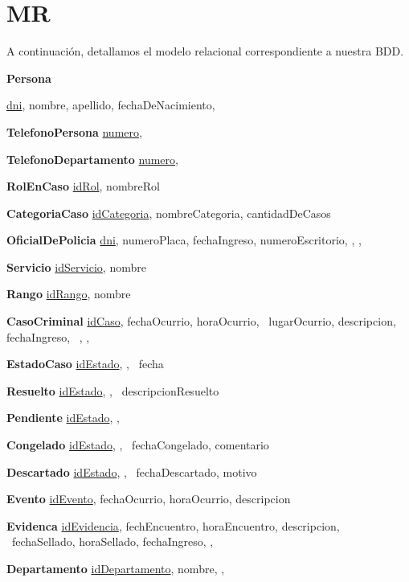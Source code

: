 \documentclass[11pt, a4paper]{article}
\begin{document}
\section{MR}
A continuación, detallamos el modelo relacional correspondiente a nuestra BDD.


\textbf{Persona} {\underline{dni}, nombre, apellido, fechaDeNacimiento, \

\textbf{TelefonoPersona} {\underline{numero}, }

\textbf{TelefonoDepartamento} {\underline{numero}, }

\textbf{RolEnCaso} {\underline{idRol}, nombreRol}

\textbf{CategoriaCaso} {\underline{idCategoria}, nombreCategoria, cantidadDeCasos}

\textbf{OficialDePolicia} {\underline{dni}, numeroPlaca, fechaIngreso, 
	numeroEscritorio, \dashuline{idRango}, \dashuline{idServicio},
	}

\textbf{Servicio} {\underline{idServicio}, nombre}

\textbf{Rango} {\underline{idRango}, nombre}

\textbf{CasoCriminal} {\underline{idCaso}, fechaOcurrio, horaOcurrio, \ 
	lugarOcurrio, descripcion, fechaIngreso, \
	, , \
	}

\textbf{EstadoCaso} {\underline{idEstado}, , \
	fecha}

\textbf{Resuelto} {\underline{idEstado}, , \ 	
	descripcionResuelto}

\textbf{Pendiente} {\underline{idEstado}, ,}

\textbf{Congelado} {\underline{idEstado}, , \
	fechaCongelado, comentario}

\textbf{Descartado} {\underline{idEstado}, , \
	fechaDescartado, motivo}

\textbf{Evento} {\underline{idEvento}, fechaOcurrio, horaOcurrio, descripcion} 

\textbf{Evidenca} {\underline{idEvidencia}, fechEncuentro, horaEncuentro, descripcion, \
	fechaSellado, horaSellado, fechaIngreso, \dashuline{idCaso}, }

\textbf{Departamento} {\underline{idDepartamento}, nombre, , }

}
\end{document}
